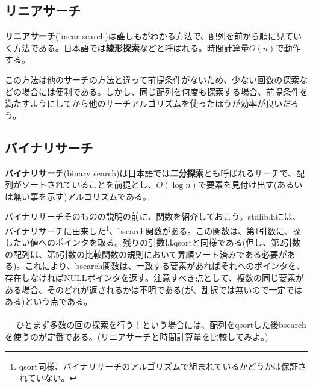 \subsection{リニアサーチ}
\textbf{リニアサーチ}(linear search)は誰しもがわかる方法で、配列を前から順に見ていく方法である。日本語では\textbf{線形探索}などと呼ばれる。時間計算量$O(n)$で動作する。

この方法は他のサーチの方法と違って前提条件がないため、少ない回数の探索などの場合には便利である。しかし、同じ配列を何度も探索する場合、前提条件を満たすようにしてから他のサーチアルゴリズムを使ったほうが効率が良いだろう。

\subsection{バイナリサーチ}
\textbf{バイナリサーチ}(binary search)は日本語では\textbf{二分探索}とも呼ばれるサーチで、配列がソートされていることを前提とし、$O(\log n)$で要素を見付け出す(あるいは無い事を示す)アルゴリズムである。

バイナリサーチそのものの説明の前に、関数を紹介しておこう。stdlib.hには、バイナリサーチに由来した\footnote{qsort同様、バイナリサーチのアルゴリズムで組まれているかどうかは保証されていない。}、bsearch関数がある。この関数は、第1引数に、探したい値へのポインタを取る。残りの引数はqsortと同様である(但し、第2引数の配列は、第5引数の比較関数の規則において昇順ソート済みである必要がある)。これにより、bsearch関数は、一致する要素があればそれへのポインタを、存在しなければNULLポインタを返す。注意すべき点として、複数の同じ要素がある場合、そのどれが返されるかは不明である(が、乱択では無いので一定ではある)という点である。
\\ \\　
ひとまず多数の回の探索を行う！という場合には、配列をqsortした後bsearchを使うのが定番である。(リニアサーチと時間計算量を比較してみよ。)

